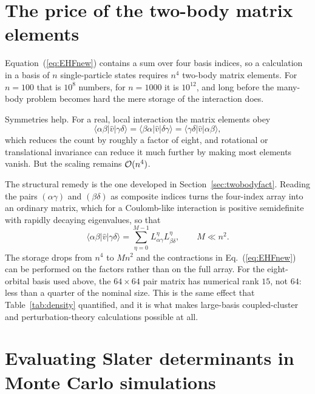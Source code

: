 \section{The price of the two-body matrix elements}
\label{sec:twobodycost}

Equation~(\ref{eq:EHFnew}) contains a sum over four basis indices, so a
calculation in a basis of $n$ single-particle states requires $n^4$ two-body
matrix elements.  For $n=100$ that is $10^8$ numbers, for $n=1000$ it is
$10^{12}$, and long before the many-body problem becomes hard the mere
storage of the interaction does.

Symmetries help.  For a real, local interaction the matrix elements obey
\begin{equation}
  \langle\alpha\beta|\hat{v}|\gamma\delta\rangle
   = \langle\beta\alpha|\hat{v}|\delta\gamma\rangle
   = \langle\gamma\delta|\hat{v}|\alpha\beta\rangle ,
  \label{eq:2-vsymmetry}
\end{equation}
which reduces the count by roughly a factor of eight, and rotational or
translational invariance can reduce it much further by making most elements
vanish.  But the scaling remains $\mathcal{O}(n^4)$.

The structural remedy is the one developed in
Section~\ref{sec:twobodyfact}.  Reading the pairs $(\alpha\gamma)$ and
$(\beta\delta)$ as composite indices turns the four-index array into an
ordinary matrix, which for a Coulomb-like interaction is positive
semidefinite with rapidly decaying eigenvalues, so that
\begin{equation}
  \langle\alpha\beta|\hat{v}|\gamma\delta\rangle
   = \sum_{\eta=0}^{M-1} L^{\eta}_{\alpha\gamma}L^{\eta}_{\beta\delta},
  \qquad M \ll n^2 .
  \label{eq:2-cholesky}
\end{equation}
The storage drops from $n^4$ to $Mn^2$ and the contractions in
Eq.~(\ref{eq:EHFnew}) can be performed on the factors rather than on the full
array.  For the eight-orbital basis used above, the $64\times64$ pair matrix
has numerical rank $15$, not $64$: less than a quarter of the nominal size.
This is the same effect that Table~\ref{tab:density} quantified, and it is
what makes large-basis coupled-cluster and perturbation-theory calculations
possible at all.


\section{Evaluating Slater determinants in Monte Carlo simulations}
\label{sec:slaterupdate}

